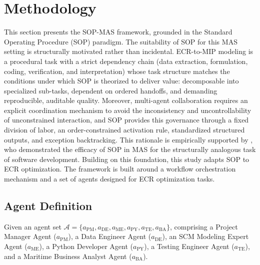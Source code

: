 \documentclass[preprint,12pt]{elsarticle}
\begin{document}
\section{Methodology}

This section presents the SOP-MAS framework, grounded in the Standard Operating Procedure (SOP) paradigm. The suitability of SOP for this MAS setting is structurally motivated rather than incidental. ECR-to-MIP modeling is a procedural task with a strict dependency chain (data extraction, formulation, coding, verification, and interpretation) whose task structure matches the conditions under which SOP is theorized to deliver value: decomposable into specialized sub-tasks, dependent on ordered handoffs, and demanding reproducible, auditable quality. Moreover, multi-agent collaboration requires an explicit coordination mechanism to avoid the inconsistency and uncontrollability of unconstrained interaction, and SOP provides this governance through a fixed division of labor, an order-constrained activation rule, standardized structured outputs, and exception backtracking. This rationale is empirically supported by \citet{hongMetaGPTMetaProgramming2023a}, who demonstrated the efficacy of SOP in MAS for the structurally analogous task of software development. Building on this foundation, this study adapts SOP to ECR optimization. The framework is built around a workflow orchestration mechanism and a set of agents designed for ECR optimization tasks.

\subsection{Agent Definition}
Given an agent set $\mathcal{A}=\{a_{\text{PM}}, a_{\text{DE}}, a_{\text{ME}}, a_{\text{PY}}, a_{\text{TE}}, a_{\text{BA}}\}$, comprising a Project Manager Agent ($a_{\text{PM}}$), a Data Engineer Agent ($a_{\text{DE}}$), an SCM Modeling Expert Agent ($a_{\text{ME}}$), a Python Developer Agent ($a_{\text{PY}}$), a Testing Engineer Agent ($a_{\text{TE}}$), and a Maritime Business Analyst Agent ($a_{\text{BA}}$).
\end{document}
